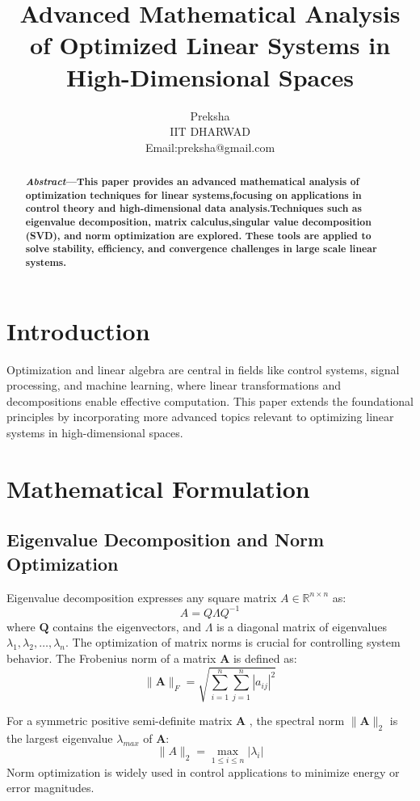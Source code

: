\documentclass[twocolumn]{IEEEtran}
\title{Advanced Mathematical Analysis of Optimized
Linear Systems in High-Dimensional Spaces}
\author{Preksha\\
IIT DHARWAD \\ 
Email:preksha@gmail.com}
\begin{document}
\begin{samepage}
\maketitle
\renewcommand{\abstractname}{}
\begin{abstract}\textbf{\emph{Abstract}}\textbf{---This paper provides an advanced mathematical analysis of optimization techniques for linear systems,focusing on applications in control theory and high-dimensional data analysis.Techniques such as eigenvalue decomposition, matrix calculus,singular value decomposition (SVD), and norm optimization are explored. These tools are applied to solve stability, efficiency, and convergence challenges in large scale linear systems.}
\end{abstract}
\section{Introduction}
 Optimization and linear algebra are central in fields like control systems, signal processing, and machine learning, where linear transformations and decompositions enable effective computation. This paper extends the foundational principles by incorporating more advanced topics relevant to optimizing linear systems in high-dimensional spaces.
 \section{Mathematical Formulation}
 \subsection{ Eigenvalue Decomposition and Norm Optimization}
 Eigenvalue decomposition expresses any square matrix \textbf{\(A \in \mathbb{R}^{n\times n}\) } as: 
 \boldmath
 \begin{equation}
A = Q \Lambda Q^{-1}
 \end{equation}
\unboldmath
 where \(\textbf{Q}\) contains the eigenvectors, and \textbf{$\Lambda$} is a diagonal matrix of eigenvalues $\lambda_{1},\lambda_{2},\ldots,\lambda_{n}$.
  The optimization of matrix norms is crucial for controlling system behavior. The Frobenius norm of a matrix $\textbf{A}$ is defined as:
 \begin{equation}
     \| \textbf{A} \|_{F} = \sqrt{\sum_{i=1}^{n} \sum_{j=1}^{n} |a_{ij} |^2}
 \end{equation} 
\par For a symmetric positive semi-definite matrix $\textbf{A}$ , the spectral
 norm $ \| \textbf{A} \|_2$ is the largest eigenvalue $\lambda_{max}$ of \textbf{A}:
 \begin{equation}
     \|A\|_{2} =\max_{1 \le i \le n} |\lambda_{i}|
 \end{equation}
Norm optimization is widely used in control applications to minimize energy or error magnitudes.

\end{samepage}
\end{document}
